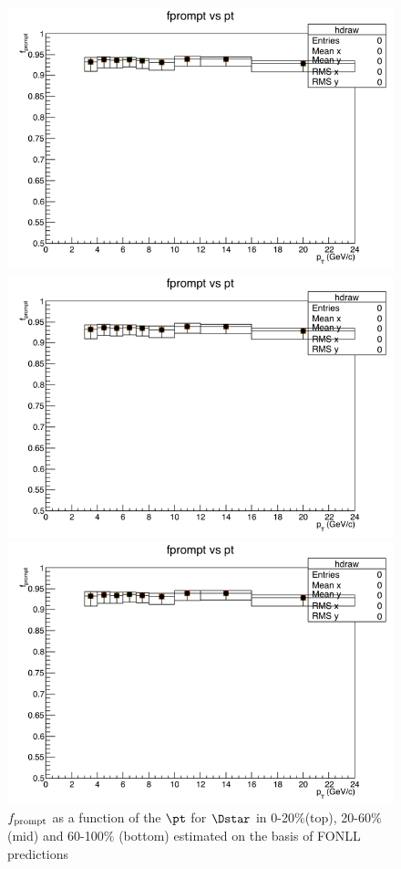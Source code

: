 \begin{figure}
\centering
\includegraphics[width=0.6\linewidth]{figuresVsCent/Dstar/EffAndFeed/fPrompt_020.png}

\includegraphics[width=0.6\linewidth]{figuresVsCent/Dstar/EffAndFeed/fPrompt_2060.png}

\includegraphics[width=0.6\linewidth]{figuresVsCent/Dstar/EffAndFeed/fPrompt_60100.png}


\caption{$f_{\rm prompt}$ as a function of the $\pt$ for $\Dstar$ in 0-20$\%$(top), 20-60$\%$ (mid) and 60-100$\%$ (bottom) estimated on the basis of FONLL predictions}
\label{fpromptDstar}
\end{figure}



